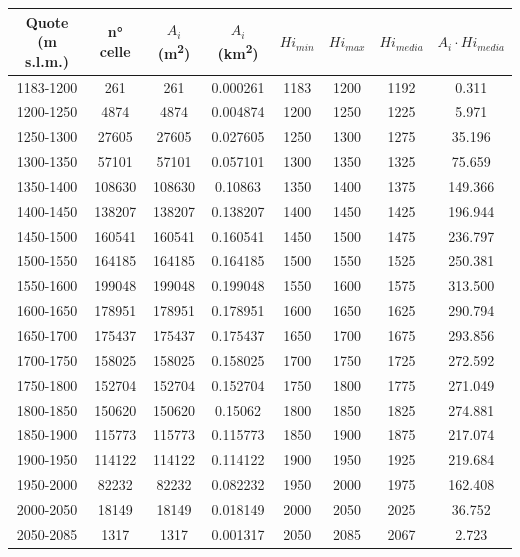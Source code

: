 \begin{table}[H]
    \begin{tabular}{cccccccc}
        \toprule
    Quote (m s.l.m.) & n° celle & $A_i$ (\unit{m^2}) & $A_i$ (\unit{km^2}) & $Hi_{min}$ & $Hi_{max}$ & $Hi_{media}$ & $A_i \cdot Hi_{media}$ \\
   \midrule
    1183-1200                 & 261      & 261     & 0.000261 & 1183   & 1200   & 1192     & 0.311         \\
    1200-1250                 & 4874     & 4874    & 0.004874 & 1200   & 1250   & 1225     & 5.971         \\
    1250-1300                 & 27605    & 27605   & 0.027605 & 1250   & 1300   & 1275     & 35.196        \\
    1300-1350                 & 57101    & 57101   & 0.057101 & 1300   & 1350   & 1325     & 75.659        \\
    1350-1400                 & 108630   & 108630  & 0.10863  & 1350   & 1400   & 1375     & 149.366       \\
    1400-1450                 & 138207   & 138207  & 0.138207 & 1400   & 1450   & 1425     & 196.944       \\
    1450-1500                 & 160541   & 160541  & 0.160541 & 1450   & 1500   & 1475     & 236.797       \\
    1500-1550                 & 164185   & 164185  & 0.164185 & 1500   & 1550   & 1525     & 250.381       \\
    1550-1600                 & 199048   & 199048  & 0.199048 & 1550   & 1600   & 1575     & 313.500       \\
    1600-1650                 & 178951   & 178951  & 0.178951 & 1600   & 1650   & 1625     & 290.794       \\
    1650-1700                 & 175437   & 175437  & 0.175437 & 1650   & 1700   & 1675     & 293.856       \\
    1700-1750                 & 158025   & 158025  & 0.158025 & 1700   & 1750   & 1725     & 272.592       \\
    1750-1800                 & 152704   & 152704  & 0.152704 & 1750   & 1800   & 1775     & 271.049       \\
    1800-1850                 & 150620   & 150620  & 0.15062  & 1800   & 1850   & 1825     & 274.881       \\
    1850-1900                 & 115773   & 115773  & 0.115773 & 1850   & 1900   & 1875     & 217.074       \\
    1900-1950                 & 114122   & 114122  & 0.114122 & 1900   & 1950   & 1925     & 219.684       \\
    1950-2000                 & 82232    & 82232   & 0.082232 & 1950   & 2000   & 1975     & 162.408       \\
    2000-2050                 & 18149    & 18149   & 0.018149 & 2000   & 2050   & 2025     & 36.752        \\
    2050-2085                 & 1317     & 1317    & 0.001317 & 2050   & 2085   & 2067     & 2.723        \\
    \bottomrule
\end{tabular}
    \end{table}
